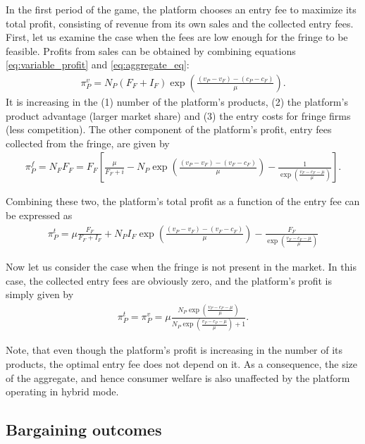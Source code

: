 \documentclass[a4paper]{article}
\begin{document}
In the first period of the game, the platform chooses an entry fee to maximize its total profit, consisting of revenue from its own sales and the collected entry fees.
First, let us examine the case when the fees are low enough for the fringe to be feasible.
Profits from sales can be obtained by combining equations \eqref{eq:variable_profit} and \eqref{eq:aggregate_eq}:
\begin{align*}
    \pi_P^{v} = N_P (F_F + I_F) \exp \left( \frac{(v_P - v_F) - (c_P - c_F)}{\mu} \right).
\end{align*}
It is increasing in the (1) number of the platform's products, (2) the platform's product advantage (larger market share) and (3) the entry costs for fringe firms (less competition).
The other component of the platform's profit, entry fees collected from the fringe, are given by
\begin{align*}
    \pi_P^{f} = N_F F_F = F_F \left[ \frac{\mu}{F_F + i} - N_P \exp \left( \frac{(v_P - v_F) - (v_F - c_F)}{\mu} \right) - \frac{1}{\exp \left( \frac{v_F - c_F - \mu}{\mu} \right)} \right].
\end{align*}

Combining these two, the platform's total profit as a function of the entry fee can be expressed as
\begin{align*}
    \pi_P^{t} = \mu\frac{F_F}{F_F + I_F} + N_P I_F \exp \left( \frac{(v_P - v_F) - (v_F - c_F)}{\mu} \right) - \frac{F_F}{\exp \left( \frac{v_F - c_F - \mu}{\mu} \right)}
\end{align*}

Now let us consider the case when the fringe is not present in the market.
In this case, the collected entry fees are obviously zero, and the platform's profit is simply given by
\begin{align*}
    \pi_P^{t} = \pi_P^{v} = \mu \frac{ N_P \exp \left( \frac{v_P - c_P - \mu}{\mu} \right)}{N_P \exp\left( \frac{v_P - c_P - \mu}{\mu} \right) + 1}.
\end{align*}

Note, that even though the platform's profit is increasing in the number of its products, the optimal entry fee does not depend on it.
As a consequence, the size of the aggregate, and hence consumer welfare is also unaffected by the platform operating in hybrid mode.


\subsection{Bargaining outcomes}
\end{document}
